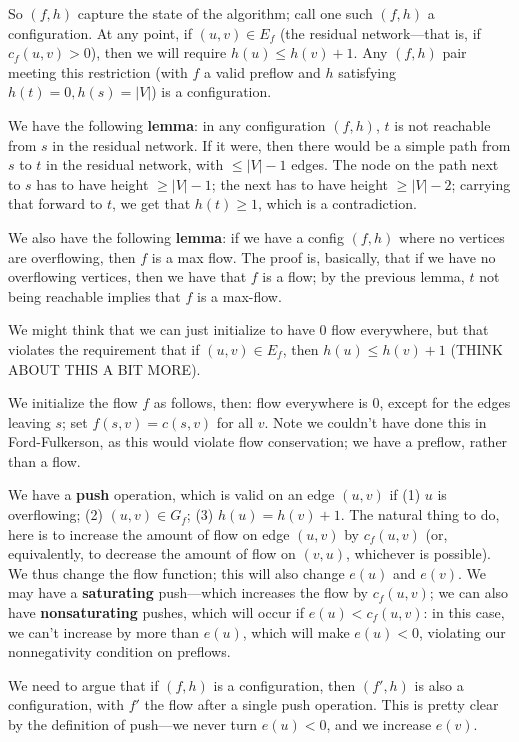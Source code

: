\documentclass{article}
\begin{document}
So $(f,h)$ capture the state of the algorithm; call one such $(f,h)$ a
configuration.
At any point, if $(u,v) \in E_f$ (the residual network---that is, if
$c_f(u,v) > 0$), then we will require $h(u) \leq h(v) + 1$.
Any $(f,h)$ pair meeting this restriction (with $f$ a valid preflow and
$h$ satisfying $h(t) = 0, h(s) = |V|$) is a configuration.

We have the following \textbf{lemma}: in any configuration $(f,h)$, 
$t$ is not reachable from $s$ in the residual network. If it
were, then there would be a simple path from $s$ to $t$ in the residual
network, with $\leq |V| - 1$ edges. The node on the path next to 
$s$ has to have height $\geq |V| - 1$; the next has to have height
$\geq |V| - 2$; carrying that forward to $t$, we get that
$h(t) \geq 1$, which is a contradiction.

We also have the following \textbf{lemma}: if we have a config $(f,h)$
where no vertices are overflowing, then $f$ is a max flow.
The proof is, basically, that if we have no overflowing vertices, then
we have that $f$ is a flow; by the previous lemma, $t$ not being
reachable implies that $f$ is a max-flow.

We might think that we can just initialize to have 0 flow everywhere,
but that violates the requirement that if $(u,v) \in E_f$, then
$h(u) \leq h(v) + 1$ (THINK ABOUT THIS A BIT MORE).

We initialize the flow $f$ as follows, then: flow everywhere is $0$, except
for the edges leaving $s$; set $f(s,v) = c(s,v)$ for all $v$.
Note we couldn't have done this in Ford-Fulkerson, as this would violate
flow conservation; we have a preflow, rather than a flow.

We have a \textbf{push} operation, which is valid on an edge $(u,v)$ if
(1) $u$ is overflowing;
(2) $(u,v) \in G_f$;
(3) $h(u) = h(v) + 1$.
The natural thing to do, here is to increase the amount of flow on
edge $(u,v)$ by $c_f(u,v)$ (or, equivalently, to decrease the amount of
flow on $(v,u)$, whichever is possible).
We thus change the flow function; this will also change $e(u)$ and $e(v)$.
We may have a \textbf{saturating} push---which increases the flow by 
$c_f(u,v)$; we can also have \textbf{nonsaturating} pushes, which will occur
if $e(u) < c_f(u,v)$: in this case, we can't increase by more than $e(u)$, 
which will make $e(u) < 0$, violating our nonnegativity condition on preflows.

We need to argue that if $(f,h)$ is a configuration, then $(f',h)$ is also
a configuration, with $f'$ the flow after a single push operation.
This is pretty clear by the definition of push---we never turn
$e(u) < 0$, and we increase $e(v)$.
\end{document}
